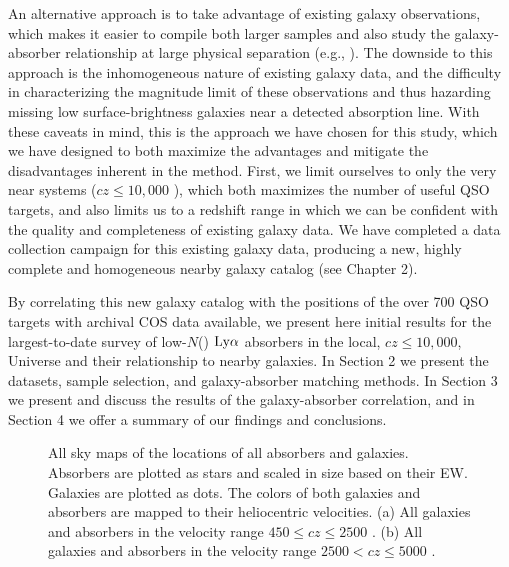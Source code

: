 An alternative approach is to take advantage of existing galaxy observations, which makes it easier to compile both larger samples and also study the galaxy-absorber relationship at large physical separation (e.g., \citealt{wakker2009, rudie2012a}). The downside to this approach is the inhomogeneous nature of existing galaxy data, and the difficulty in characterizing the magnitude limit of these observations and thus hazarding missing low surface-brightness galaxies near a detected absorption line. With these caveats in mind, this is the approach we have chosen for this study, which we have designed to both maximize the advantages and mitigate the disadvantages inherent in the method. First, we limit ourselves to only the very near systems ($cz \leq 10,000$ \kms), which both maximizes the number of useful QSO targets, and also limits us to a redshift range in which we can be confident with the quality and completeness of existing galaxy data. We have completed a data collection campaign for this existing galaxy data, producing a new, highly complete and homogeneous nearby galaxy catalog (see Chapter 2). 

By correlating this new galaxy catalog with the positions of the over 700 QSO targets with archival COS data available, we present here initial results for the largest-to-date survey of low-$N$(\HI) $\rm Ly\alpha$ absorbers in the local, $cz \leq 10,000$\kms, Universe and their relationship to nearby galaxies. In Section 2 we present the datasets, sample selection, and galaxy-absorber matching methods. In Section 3 we present and discuss the results of the galaxy-absorber correlation, and in Section 4 we offer a summary of our findings and conclusions.


\begin{figure}[ht!]
\centering
  \label{allsky_2500}
  \label{allsky_5000}
  \caption{\small{All sky maps of the locations of all absorbers and galaxies. Absorbers are plotted as stars and scaled in size based on their EW. Galaxies are plotted as dots. The colors of both galaxies and absorbers are mapped to their heliocentric velocities. (a) All galaxies and absorbers in the velocity range $450 \leq cz \leq 2500$ \kms. (b) All galaxies and absorbers in the velocity range $2500 < cz \leq 5000$ \kms.}}
\label{allsky_2500-5000}
\end{figure}


